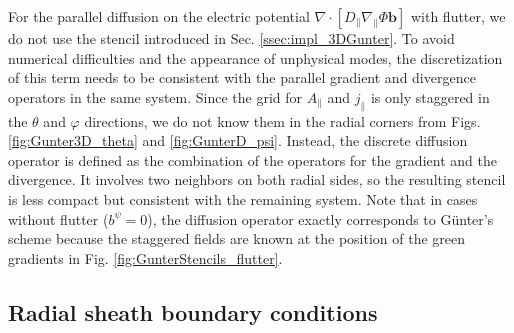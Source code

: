 For the parallel diffusion on the electric potential $\nabla \cdot \left[ D_\parallel \nabla_\parallel \Phi \mathbf{b} \right]$ with flutter, we do not use the stencil introduced in Sec. \ref{ssec:impl_3DGunter}. To avoid numerical difficulties and the appearance of unphysical modes, the discretization of this term needs to be consistent with the parallel gradient and divergence operators in the same system. Since the grid for $A_\parallel$ and $j_\parallel$ is only staggered in the $\theta$ and $\varphi$ directions, we do not know them in the radial corners from Figs. \ref{fig:Gunter3D_theta} and \ref{fig:GunterD_psi}. Instead, the discrete diffusion operator is defined as the combination of the operators for the gradient and the divergence. It involves two neighbors on both radial sides, so the resulting stencil is less compact but consistent with the remaining system. Note that in cases without flutter ($b^\psi = 0$), the diffusion operator exactly corresponds to Günter's scheme \cite{gunter2005} because the staggered fields are known at the position of the green gradients in Fig. \ref{fig:GunterStencils_flutter}.


 
\subsection{Radial sheath boundary conditions}


